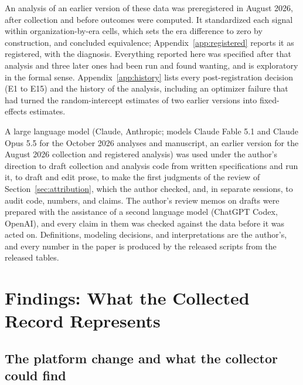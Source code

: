 \documentclass[acmsmall,screen,review,anonymous]{acmart}
\begin{document}
An analysis of an earlier version of these data was preregistered in August 2026, after collection and before outcomes were computed. It standardized each signal within organization-by-era cells, which sets the era difference to zero by construction, and concluded equivalence; Appendix~\ref{app:registered} reports it as registered, with the diagnosis. Everything reported here was specified after that analysis and three later ones had been run and found wanting, and is exploratory in the formal sense. Appendix~\ref{app:history} lists every post-registration decision (E1 to E15) and the history of the analysis, including an optimizer failure that had turned the random-intercept estimates of two earlier versions into fixed-effects estimates.

A large language model (Claude, Anthropic; models Claude Fable 5.1 and Claude Opus 5.5 for the October 2026 analyses and manuscript, an earlier version for the August 2026 collection and registered analysis) was used under the author's direction to draft collection and analysis code from written specifications and run it, to draft and edit prose, to make the first judgments of the review of Section~\ref{sec:attribution}, which the author checked, and, in separate sessions, to audit code, numbers, and claims. The author's review memos on drafts were prepared with the assistance of a second language model (ChatGPT Codex, OpenAI), and every claim in them was checked against the data before it was acted on. Definitions, modeling decisions, and interpretations are the author's, and every number in the paper is produced by the released scripts from the released tables.

\section{Findings: What the Collected Record Represents}
\label{sec:record}

\subsection{The platform change and what the collector could find}
\label{sec:platform}
\end{document}
